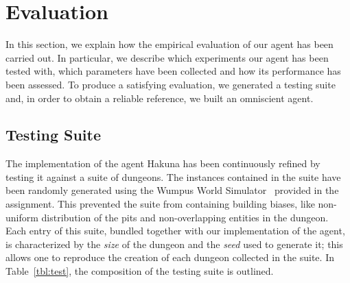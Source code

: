 \documentclass{llncs}
\begin{document}



\section{Evaluation}

In this section, we explain how the empirical evaluation of our agent has been carried out.
In particular, we describe which experiments our agent has been tested with, which parameters have been collected and how its performance has been assessed.
To produce a satisfying evaluation, we generated a testing suite and, in order to obtain a reliable reference, we built an omniscient agent.

\subsection{Testing Suite}

The implementation of the agent Hakuna has been continuously refined by testing it against a suite of dungeons.
The instances contained in the suite have been randomly generated using the Wumpus World Simulator~\cite{WWS} provided in the assignment.
This prevented the suite from containing building biases, like non-uniform distribution of the pits and non-overlapping entities in the dungeon.
Each entry of this suite, bundled together with our implementation of the agent, is characterized by the \emph{size} of the dungeon and the \emph{seed} used to generate it; this allows one to reproduce the creation of each dungeon collected in the suite.
In Table~\ref{tbl:test}, the composition of the testing suite is outlined.
\end{document}
